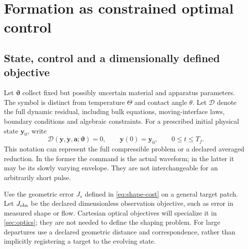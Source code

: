 \section{Formation as constrained optimal control}\label{sec:control}

\subsection{State, control and a dimensionally defined objective}
Let $\bm\vartheta$ collect fixed but possibly uncertain material and apparatus
parameters. The symbol is distinct from temperature $\Theta$ and contact angle
$\theta$. Let $\mathcal D$ denote the full dynamic residual, including bulk
equations, moving-interface laws, boundary conditions and algebraic constraints.
For a prescribed initial physical state $\bm y_0$, write
\begin{equation}
 \mathcal D(\bm y,\dot{\bm y},\bm a;\bm\vartheta)=0,
 \qquad \bm y(0)=\bm y_0,\qquad 0\leq t\leq T_f.
 \label{eq:dynamic-constraint}
\end{equation}
This notation can represent the full compressible problem or a declared
averaged reduction. In the former the command is the actual waveform; in the
latter it may be its slowly varying envelope. They are not interchangeable
for an arbitrarily short pulse.

Use the geometric error $J_s$ defined in \cref{eq:shape-cost} on a general
target patch. Let $J_{\rm obs}$ be the declared dimensionless observation
objective, such as error in measured shape or flow. Cartesian optical
objectives will specialize it in \cref{sec:optics}; they are not needed to
define the shaping problem. For large departures use a declared geometric
distance and correspondence, rather than implicitly registering a target to
the evolving state.

